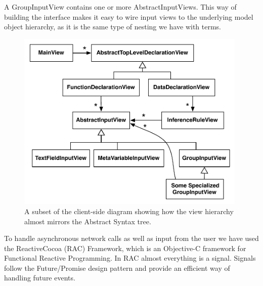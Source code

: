 A GroupInputView contains one or more AbstractInputViews. This way of building
the interface makes it easy to wire input views to the underlying model object
hierarchy, as it is the same type of nesting we have with terms.

\begin{figure}
	\centering
		\includegraphics[width=110mm]{diagrams/client_side_class_diagram.pdf}
	\caption{A subset of the client-side diagram showing how the view hierarchy
	almost mirrors the Abstract Syntax tree.}
	\label{fig:clientViewArchitecture}
\end{figure}

To handle asynchronous network calls as well as input from the user we have
used the ReactiveCocoa (RAC) Framework, which is an Objective-C framework for
Functional Reactive Programming. In RAC almost everything is a
signal. Signals follow the Future/Promise design pattern and provide an
efficient way of handling future events.












